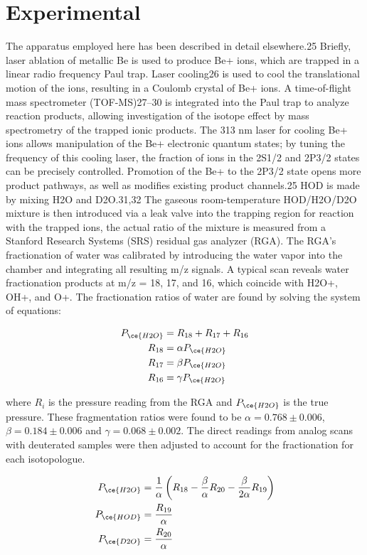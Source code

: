 \section{Experimental}

The apparatus employed here has been described in detail elsewhere.25 Briefly, laser ablation of metallic Be is used to produce Be+ ions, which are trapped in a linear radio frequency Paul trap. Laser cooling26 is used to cool the translational motion of the ions, resulting in a Coulomb crystal of Be+ ions. A time-of-flight mass spectrometer (TOF-MS)27–30 is integrated into the Paul trap to analyze reaction products, allowing investigation of the isotope effect by mass spectrometry of the trapped ionic products. The 313 nm laser for cooling Be+ ions allows manipulation of the Be+ electronic quantum states; by tuning the frequency of this cooling laser, the fraction of ions in the 2S1/2 and 2P3/2 states can be precisely controlled. Promotion
of the Be+ to the 2P3/2 state opens more product pathways, as well as modifies existing product channels.25
HOD is made by mixing H2O and D2O.31,32 The gaseous room-temperature HOD/H2O/D2O mixture is then introduced
via a leak valve into the trapping region for reaction with the trapped ions, the actual ratio of the mixture is measured from a Stanford Research Systems (SRS) residual gas analyzer (RGA). The RGA’s fractionation of water was calibrated by introducing the water vapor into the chamber and integrating all resulting m/z signals.
A typical scan reveals water fractionation products at m/z = 18, 17, and 16, which coincide with H2O+, OH+, and O+. The fractionation ratios of water are found by solving the system of equations:

\begin{align}
	P_{\ce{H2O}} & = R_{18} + R_{17} + R_{16} \\
	R_{18} & = \alpha P_{\ce{H2O}} \\
	R_{17} & = \beta P_{\ce{H2O}} \\
	R_{16} & = \gamma P_{\ce{H2O}}
\end{align}

where $R_i$ is the pressure reading from the RGA and $P_{\ce{H2O}}$ is the true  pressure. These fragmentation ratios were found to be $\alpha = 0.768 \pm 0.006$, $\beta = 0.184 \pm 0.006$ and $\gamma = 0.068 \pm 0.002$. The
direct readings from analog scans with deuterated samples were then adjusted to account for the fractionation for each isotopologue.

\begin{align}
	P_{\ce{H2O}} & = \frac{1}{\alpha}\left(R_{18} - \frac{\beta}{\alpha}R_{20} - \frac{\beta}{2\alpha} R_{19}\right) \\
	P_{\ce{HOD}} & = \frac{R_{19}}{\alpha} \\
	P_{\ce{D2O}} & = \frac{R_{20}}{\alpha}
\end{align}

